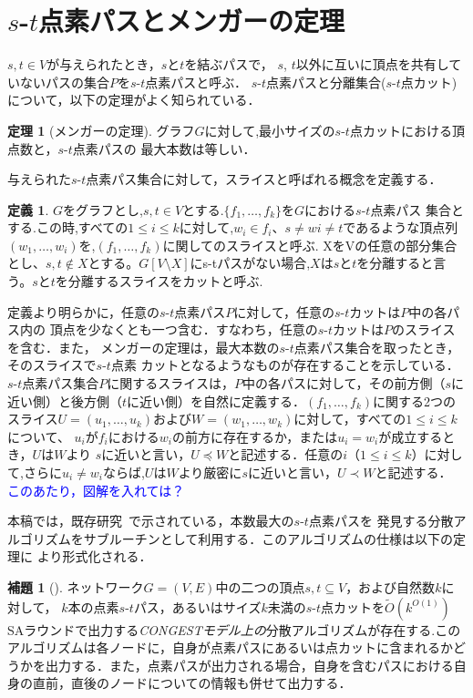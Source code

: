 \documentclass{thesis}
\theoremstyle{definition}
\newtheorem{theorem}{定理}
\newtheorem{lemma}{補題}
\newtheorem{definition}{定義}
\newcommand{\Izumi}[1]{\textcolor{blue}{#1}}
\begin{document}
\section{$s$-$t$点素パスとメンガーの定理}

$s, t \in V$が与えられたとき，$s$と$t$を結ぶパスで，
$s$, $t$以外に互いに頂点を共有していないパスの集合$P$を$s$-$t$点素パスと呼ぶ．
$s$-$t$点素パスと分離集合($s$-$t$点カット)について，以下の定理がよく知られている．

\begin{theorem}[メンガーの定理] \label{menger}
グラフ$G$に対して,最小サイズの$s$-$t$点カットにおける頂点数と，$s$-$t$点素パスの
最大本数は等しい．
\end{theorem}
与えられた$s$-$t$点素パス集合に対して，スライスと呼ばれる概念を定義する．
\begin{definition}
    $G$をグラフとし,$s,t\in V$とする.$\{f_1, \dots ,f_k\}$を$G$における$s$-$t$点素パス
    集合とする.この時,すべての$1\leq i\leq k$に対して,$w_i \in f_i$、$s \neq wi \neq t$であるような頂点列$(w_1, \dots ,w_i)$を,$(f_1, \dots ,f_k)$に関してのスライスと呼ぶ.
    XをVの任意の部分集合とし、$s,t \notin X$とする。$G[V\setminus X]$にs-tパスがない場合,$X$は$s$と$t$を分離すると言う。$s$と$t$を分離するスライスをカットと呼ぶ.
\end{definition}

定義より明らかに，任意の$s$-$t$点素パス$P$に対して，任意の$s$-$t$カットは$P$中の各パス内の
頂点を少なくとも一つ含む．すなわち，任意の$s$-$t$カットは$P$のスライスを含む．また，
メンガーの定理は，最大本数の$s$-$t$点素パス集合を取ったとき，そのスライスで$s$-$t$点素
カットとなるようなものが存在することを示している．
$s$-$t$点素パス集合$P$に関するスライスは，$P$中の各パスに対して，その前方側（$s$に近い側）と後方側（$t$に近い側）を自然に定義する．$(f_1, \dots ,f_k)$に関する2つのスライス$U=(u_1, \dots, u_k)$および$W=(w_1, \dots ,w_k)$に対して，すべての$1\leq i\leq k$について、
$u_i$が$f_i$における$w_i$の前方に存在するか，または$u_i=w_i$が成立するとき，$U$は$W$より
$s$に近いと言い，$U\preceq W$と記述する．任意の$i$（$1 \leq i \leq k$）に対して,さらに$u_i \neq w_i$ならば,$U$は$W$より厳密に$s$に近いと言い，$U \prec W$と記述する．
\Izumi{このあたり，図解を入れては？}


本稿では，既存研究~\cite{li2018distributed}で示されている，本数最大の$s$-$t$点素パスを
発見する分散アルゴリズムをサブルーチンとして利用する．このアルゴリズムの仕様は以下の定理に
より形式化される．

\begin{lemma}[\cite{li2018distributed}] \label{path}
ネットワーク$G=(V,E)$中の二つの頂点$s,t\subseteq V$，および自然数$k$に対して，
$k$本の点素$s$-$t$パス，あるいはサイズ$k$未満の$s$-$t$点カットを$\tilde{O}(k^{O(1)})$
SAラウンドで出力する\textit{CONGESTモデル上の}分散アルゴリズムが存在する.このアルゴリズムは各ノードに，自身が点素パスにあるいは点カットに含まれるかどうかを出力する．また，点素パスが出力される場合，自身を含むパスにおける自身の直前，直後のノードについての情報も併せて出力する．
\end{lemma}
\end{document}
